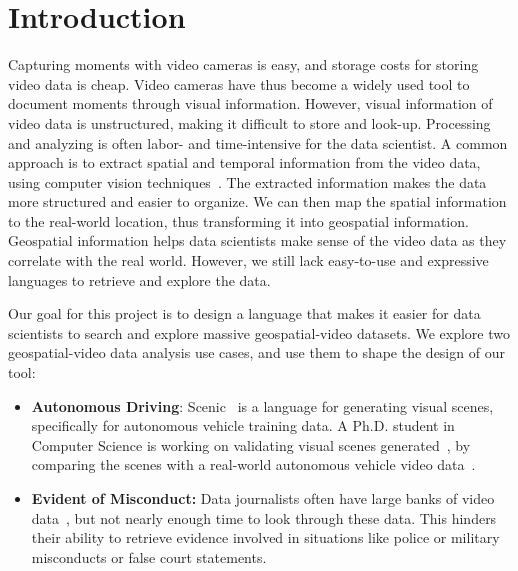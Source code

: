 
\section{Introduction}

Capturing moments with video cameras is easy, and storage costs for storing video data is cheap. Video cameras have thus become a widely used tool to document moments through visual information.
However, visual information of video data is unstructured, making it difficult to store and look-up.
Processing and analyzing is often labor- and time-intensive for the data scientist. 
A common approach is to extract spatial and temporal information from the video data, using computer vision techniques~\cite{redmon:yolo,wojke:deepsort}.
The extracted information makes the data more structured and easier to organize.
We can then map the spatial information to the real-world location, thus transforming it into geospatial information.
Geospatial information helps data scientists make sense of the video data as they correlate with the real world.
However, we still lack easy-to-use and expressive languages to retrieve and explore the data.

Our goal for this project is to design a language that makes it easier for data scientists to search and explore massive geospatial-video datasets. We explore two geospatial-video data analysis use cases, and use them to shape the design of our tool:

\begin{itemize}
    \item
    \textbf{Autonomous Driving}: Scenic~\cite{fremont:scenic} is a language for generating visual scenes, specifically for autonomous vehicle training data.
    A Ph.D. student in Computer Science is working on validating visual scenes generated~\cite{kim:scenic-validation},
    by comparing the scenes with a real-world autonomous vehicle video data~\cite{ceasar:nuscenes}.
    
    \item
    \textbf{Evident of Misconduct:}
    Data journalists often have large banks of video data~\cite{mcdowell:myanmar}, but not nearly enough time to look through these data. This hinders their ability to retrieve evidence involved in situations like police or military misconducts or false court statements.
\end{itemize}

